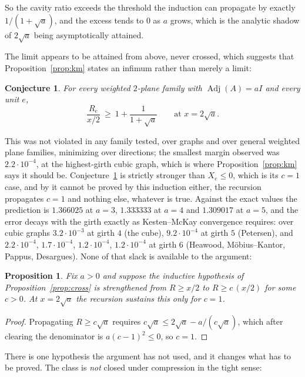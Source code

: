 \documentclass[11pt]{article}
\newtheorem{conjecture}[theorem]{Conjecture}
\newtheorem{proposition}[theorem]{Proposition}
\theoremstyle{remark}
\begin{document}
So the cavity ratio exceeds the threshold the induction can propagate by exactly
$1/(1+\sqrt a)$, and the excess tends to $0$ as $a$ grows, which is the analytic shadow
of $2\sqrt a$ being asymptotically attained.

The limit appears to be attained from above, never crossed, which suggests that
Proposition~\ref{prop:km} states an infimum rather than merely a limit:

\begin{conjecture}\label{conj:km}
For every weighted $2$-plane family with $\operatorname{Adj}(A)=aI$ and every unit $e$,
\[
\frac{R_e}{x/2}\ \ge\ 1+\frac1{1+\sqrt a}\qquad\text{at }x=2\sqrt a .
\]
\end{conjecture}

This was not violated in any family tested, over graphs and over general weighted plane
families, minimizing over directions; the smallest margin observed was
$2.2\cdot10^{-4}$, at the highest-girth cubic graph, which is where
Proposition~\ref{prop:km} says it should be. Conjecture~\ref{conj:km} is strictly
stronger than $X_e\le0$, which is its $c=1$ case, and by \cite{Supp2} it
cannot be proved by this induction either, the recursion propagates $c=1$ and nothing
else, whatever is true. Against the exact values the prediction is
$1.366025$ at $a=3$, $1.333333$ at $a=4$ and $1.309017$ at $a=5$, and the error decays
with the girth exactly as Kesten--McKay convergence requires: over cubic graphs
$3.2\cdot10^{-3}$ at girth $4$ (the cube), $9.2\cdot10^{-4}$ at girth $5$ (Petersen), and
$2.2\cdot10^{-4}$, $1.7\cdot10^{-4}$, $1.2\cdot10^{-4}$, $1.2\cdot10^{-4}$ at girth $6$
(Heawood, M\"obius--Kantor, Pappus, Desargues). None of that slack is available to the
argument:

\begin{proposition}\label{prop:rigid2}
Fix $a>0$ and suppose the inductive hypothesis of Proposition~\ref{prop:cross} is
strengthened from $R\ge x/2$ to $R\ge c\,(x/2)$ for some $c>0$. At $x=2\sqrt a$ the
recursion sustains this only for $c=1$.
\end{proposition}

\begin{proof}
Propagating $R\ge c\sqrt a$ requires $c\sqrt a\le2\sqrt a-a/(c\sqrt a)$, which after
clearing the denominator is $a(c-1)^2\le0$, so $c=1$.
\end{proof}

There is one hypothesis the argument has not used, and it changes what has to be proved.
The class is \emph{not} closed under compression in the tight sense:
\end{document}
